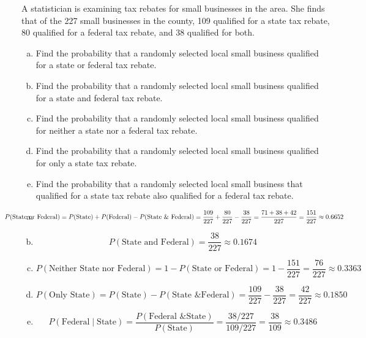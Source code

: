 \documentclass[11pt,letterpaper]{article}
\begin{document}
\newpage



 A statistician is examining tax rebates for small businesses in the area. She finds that of the 227 small businesses in the county, 109 qualified for a state tax rebate, 80 qualified for a federal tax rebate, and 38 qualified for both. 
	\begin{enumerate}[(a)]
	\item Find the probability that a randomly selected local small business qualified for a state or federal tax rebate. 
	\item Find the probability that a randomly selected local small business qualified for a state and federal tax rebate. 
	\item Find the probability that a randomly selected local small business qualified for neither a state nor a federal tax rebate. 
	\item Find the probability that a randomly selected local small business qualified for only a state tax rebate. 
	\item Find the probability that a randomly selected local small business that qualified for a state tax rebate also qualified for a federal tax rebate. 
	\end{enumerate} \pspace

\sol 
\begin{enumerate}[(a)]
\item 
	\[
	\hspace{-1.75cm} P(\text{State or Federal})= P(\text{State}) + P(\text{Federal}) - P(\text{State \& Federal})= \dfrac{109}{227} + \dfrac{80}{227} - \dfrac{38}{227}= \dfrac{71 + 38 + 42}{227}= \dfrac{151}{227} \approx 0.6652
	\] \pspace

\item 
	\[
	P(\text{State and Federal})= \dfrac{38}{227} \approx 0.1674
	\] \pspace

\item 
	\[
	P(\text{Neither State nor Federal})= 1 - P(\text{State or Federal})= 1 - \dfrac{151}{227}= \dfrac{76}{227} \approx 0.3363
	\] \pspace

\item 
	\[
	P(\text{Only State})= P(\text{State}) - P(\text{State \& Federal})= \dfrac{109}{227} - \dfrac{38}{227}= \dfrac{42}{227} \approx 0.1850
	\] \pspace

\item 
	\[
	P(\text{Federal} \;|\; \text{State})= \dfrac{P(\text{Federal \& State})}{P(\text{State})}= \dfrac{38/227}{109/227}= \dfrac{38}{109} \approx 0.3486
	\]
\end{enumerate}
\end{document}
